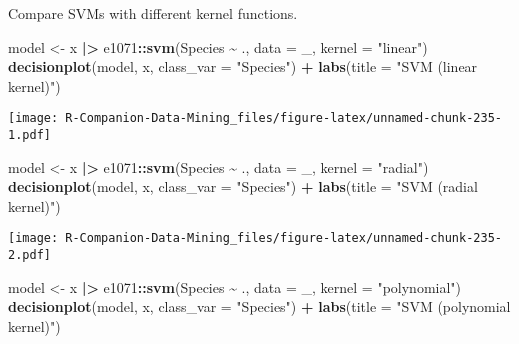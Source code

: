 \documentclass[
  notitlepage]{book}
\newenvironment{Shaded}{\begin{snugshade}}{\end{snugshade}}
\newcommand{\DataTypeTok}[1]{\textcolor[rgb]{0.13,0.29,0.53}{#1}}
\newcommand{\ErrorTok}[1]{\textcolor[rgb]{0.64,0.00,0.00}{\textbf{#1}}}
\newcommand{\KeywordTok}[1]{\textcolor[rgb]{0.13,0.29,0.53}{\textbf{#1}}}
\newcommand{\NormalTok}[1]{#1}
\newcommand{\OperatorTok}[1]{\textcolor[rgb]{0.81,0.36,0.00}{\textbf{#1}}}
\newcommand{\StringTok}[1]{\textcolor[rgb]{0.31,0.60,0.02}{#1}}
\begin{document}
Compare SVMs with different kernel functions.

\begin{Shaded}
\begin{Highlighting}[]
\NormalTok{model \textless{}{-}}\StringTok{ }\NormalTok{x }\OperatorTok{|}\ErrorTok{\textgreater{}}\StringTok{ }\NormalTok{e1071}\OperatorTok{::}\KeywordTok{svm}\NormalTok{(Species }\OperatorTok{\textasciitilde{}}\StringTok{ }\NormalTok{., }\DataTypeTok{data =}\NormalTok{ \_, }
                         \DataTypeTok{kernel =} \StringTok{"linear"}\NormalTok{)}
\KeywordTok{decisionplot}\NormalTok{(model, x, }\DataTypeTok{class\_var =} \StringTok{"Species"}\NormalTok{) }\OperatorTok{+}\StringTok{ }
\StringTok{  }\KeywordTok{labs}\NormalTok{(}\DataTypeTok{title =} \StringTok{"SVM (linear kernel)"}\NormalTok{)}
\end{Highlighting}
\end{Shaded}

\texttt{[image: R-Companion-Data-Mining\_files/figure-latex/unnamed-chunk-235-1.pdf]}

\begin{Shaded}
\begin{Highlighting}[]
\NormalTok{model \textless{}{-}}\StringTok{ }\NormalTok{x }\OperatorTok{|}\ErrorTok{\textgreater{}}\StringTok{ }\NormalTok{e1071}\OperatorTok{::}\KeywordTok{svm}\NormalTok{(Species }\OperatorTok{\textasciitilde{}}\StringTok{ }\NormalTok{., }\DataTypeTok{data =}\NormalTok{ \_, }
                         \DataTypeTok{kernel =} \StringTok{"radial"}\NormalTok{)}
\KeywordTok{decisionplot}\NormalTok{(model, x, }\DataTypeTok{class\_var =} \StringTok{"Species"}\NormalTok{) }\OperatorTok{+}\StringTok{ }
\StringTok{  }\KeywordTok{labs}\NormalTok{(}\DataTypeTok{title =} \StringTok{"SVM (radial kernel)"}\NormalTok{)}
\end{Highlighting}
\end{Shaded}

\texttt{[image: R-Companion-Data-Mining\_files/figure-latex/unnamed-chunk-235-2.pdf]}

\begin{Shaded}
\begin{Highlighting}[]
\NormalTok{model \textless{}{-}}\StringTok{ }\NormalTok{x }\OperatorTok{|}\ErrorTok{\textgreater{}}\StringTok{ }\NormalTok{e1071}\OperatorTok{::}\KeywordTok{svm}\NormalTok{(Species }\OperatorTok{\textasciitilde{}}\StringTok{ }\NormalTok{., }\DataTypeTok{data =}\NormalTok{ \_, }
                         \DataTypeTok{kernel =} \StringTok{"polynomial"}\NormalTok{)}
\KeywordTok{decisionplot}\NormalTok{(model, x, }\DataTypeTok{class\_var =} \StringTok{"Species"}\NormalTok{) }\OperatorTok{+}\StringTok{ }
\StringTok{  }\KeywordTok{labs}\NormalTok{(}\DataTypeTok{title =} \StringTok{"SVM (polynomial kernel)"}\NormalTok{)}
\end{Highlighting}
\end{Shaded}
\end{document}
